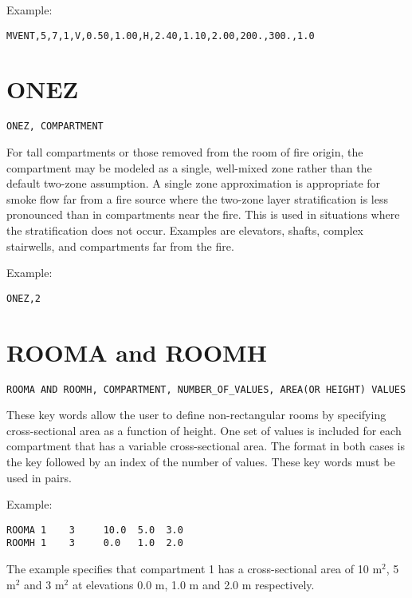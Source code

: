 Example:

\begin{lstlisting}
MVENT,5,7,1,V,0.50,1.00,H,2.40,1.10,2.00,200.,300.,1.0
\end{lstlisting}

\section{ONEZ}

\begin{lstlisting}
ONEZ, COMPARTMENT
\end{lstlisting}

For tall compartments or those removed from the room of fire origin, the compartment may be modeled as a single, well-mixed zone rather than the default two-zone assumption. A single zone approximation is appropriate for smoke flow far from a fire source where the two-zone layer stratification is less pronounced than in compartments near the fire. This is used in situations where the stratification does not occur. Examples are elevators, shafts, complex stairwells, and compartments far from the fire.

Example:

\begin{lstlisting}
ONEZ,2
\end{lstlisting}

\section{ROOMA and ROOMH}

\begin{lstlisting}
ROOMA AND ROOMH, COMPARTMENT, NUMBER_OF_VALUES, AREA(OR HEIGHT) VALUES
\end{lstlisting}

These key words allow the user to define non-rectangular rooms by specifying cross-sectional area as a function of height. One set of values is included for each compartment that has a variable cross-sectional area. The format in both cases is the key followed by an index of the number of values. These key words must be used in pairs.

Example:

\begin{lstlisting}
ROOMA 1    3     10.0  5.0  3.0
ROOMH 1    3     0.0   1.0  2.0
\end{lstlisting}

The example specifies that compartment 1 has a cross-sectional area of 10 m$^2$, 5 m$^2$ and 3 m$^2$ at elevations 0.0 m, 1.0 m and 2.0 m respectively.

